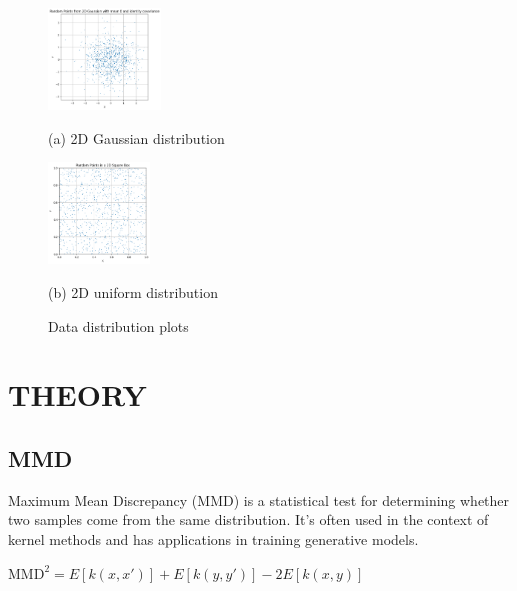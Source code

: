 \documentclass{article}
\begin{document}
\begin{figure}[htb]
  \begin{minipage}[a]{.48\linewidth}
    \centering
    \centerline{\includegraphics[width=3.0cm]{images/gaussian2d}}
    \centerline{(a) 2D Gaussian distribution}\medskip
  \end{minipage}
  \hfill
  \begin{minipage}[c]{0.48\linewidth}
    \centering
    \centerline{\includegraphics[width=2.7cm]{images/uniform2d}}
    \centerline{(b) 2D uniform distribution}\medskip
  \end{minipage}
  \caption{Data distribution plots}
  \label{fig:res}
  \end{figure}
  

\section{THEORY}
\label{sec:theory}

\subsection{MMD}
\label{ssec:mmd}

Maximum Mean Discrepancy (MMD) \cite{gretton2012kernel} is a statistical test for determining whether two samples come from the same distribution. It's often used in the context of kernel methods and has applications in training generative models.

$ \text{MMD}^2 = E[k(x, x')] + E[k(y, y')] - 2E[k(x, y)] $
\end{document}
